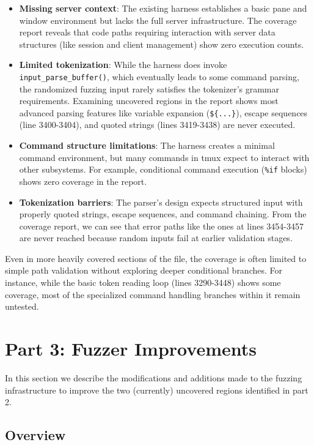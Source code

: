 \documentclass[11pt,a4paper,twocolumn]{article}
\begin{document}
\begin{itemize}
  \item \textbf{Missing server context}: The existing harness establishes a basic pane and window environment but lacks the full server infrastructure. The coverage report reveals that code paths requiring interaction with server data structures (like session and client management) show zero execution counts.
  
  \item \textbf{Limited tokenization}: While the harness does invoke \texttt{input\_parse\_buffer()}, which eventually leads to some command parsing, the randomized fuzzing input rarely satisfies the tokenizer's grammar requirements. Examining uncovered regions in the report shows most advanced parsing features like variable expansion (\texttt{\$\{...\}}), escape sequences (line 3400-3404), and quoted strings (lines 3419-3438) are never executed.
  
  \item \textbf{Command structure limitations}: The harness creates a minimal command environment, but many commands in tmux expect to interact with other subsystems. For example, conditional command execution (\texttt{\%if} blocks) shows zero coverage in the report.
  
  \item \textbf{Tokenization barriers}: The parser's design expects structured input with properly quoted strings, escape sequences, and command chaining. From the coverage report, we can see that error paths like the ones at lines 3454-3457 are never reached because random inputs fail at earlier validation stages.
\end{itemize}

Even in more heavily covered sections of the file, the coverage is often limited to simple path validation without exploring deeper conditional branches. For instance, while the basic token reading loop (lines 3290-3448) shows some coverage, most of the specialized command handling branches within it remain untested.

\section*{Part 3: Fuzzer Improvements}

In this section we describe the modifications and additions made to the fuzzing infrastructure to improve the two (currently) uncovered regions identified in part 2.

\subsection*{Overview}
\end{document}
